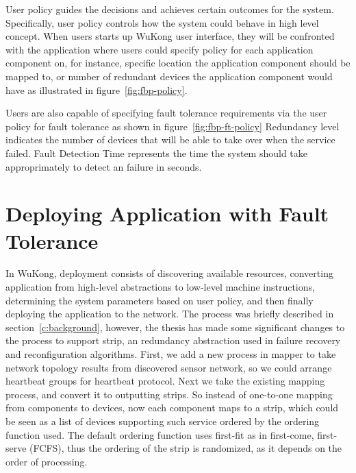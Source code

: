 User policy guides the decisions and achieves certain outcomes for the system.
Specifically, user policy controls how the system could behave in high level
concept.
When users starts up WuKong user interface, they will be confronted with the
application where users could specify policy for each application component on,
for instance, specific location the application component should be mapped to,
or number of redundant devices the application component would have as
illustrated in figure~\ref{fig:fbp-policy}.

Users are also capable of specifying fault tolerance requirements via the
user policy for fault tolerance as shown in figure~\ref{fig:fbp-ft-policy}
Redundancy level indicates the number of devices that will be able to take over
when the service failed. Fault Detection Time represents the time the system
should take approprimately to detect an failure in seconds.

\section{Deploying Application with Fault Tolerance}

In WuKong, deployment consists of discovering available resources, converting
application from high-level abstractions to low-level machine instructions,
            determining the system parameters based on user policy, and then
            finally deploying the application to the network. The process was
            briefly described in section~\ref{c:background}, however, the thesis
            has made some significant changes to the process to support strip,
            an redundancy abstraction used in failure recovery and
            reconfiguration algorithms. First, we add a new process in mapper to
            take network topology results from discovered sensor network, so we
            could arrange heartbeat groups for heartbeat protocol. Next we take
            the existing mapping process, and convert it to outputting strips.
            So instead of one-to-one mapping from components to devices, now
            each component maps to a strip, which could be seen as a list of
            devices supporting such service ordered by the ordering function
            used. The default ordering function uses first-fit as in
            first-come, first-serve (FCFS), thus the ordering of the strip is
            randomized, as it depends on the order of processing.

